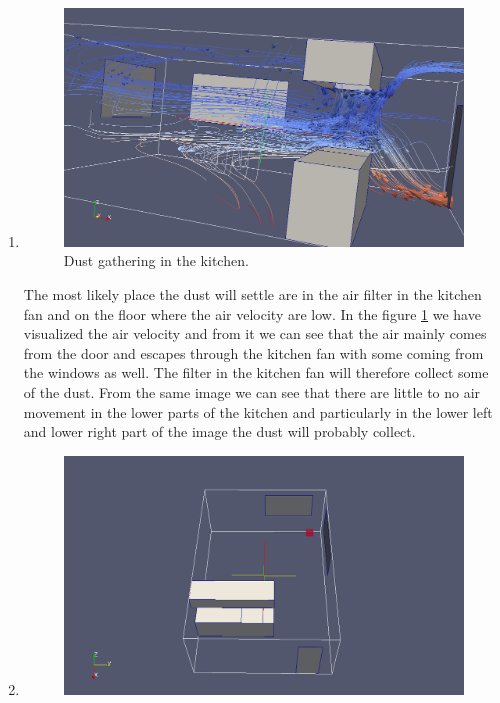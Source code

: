 \documentclass[a4paper]{article}
\begin{document}
\begin{enumerate}
    \item
        \begin{figure}
            \label{fig:dust}
            \includegraphics[width=1\linewidth]{lab5/kitchen-dust-screenshot.png}
            \caption{Dust gathering in the kitchen.}
        \end{figure}
        The most likely place the dust will settle are in the air filter in the
        kitchen fan and on the floor where the air velocity are low. In the
        figure \ref{fig:dust} we have visualized the air velocity and from it we can see
        that the air mainly comes from the door and escapes through the kitchen
        fan with some coming from the windows as well. The filter in the kitchen
        fan will therefore collect some of the dust. From the same image we can
        see that there are little to no air movement in the lower parts of the
        kitchen and particularly in the lower left and lower right part of the
        image the dust will probably collect.
    \item
        \begin{figure}
            \label{fig:pressure}
            \includegraphics[width=1\linewidth]{lab5/kitchen-highest-pressure-screenshot.png}

\end{figure}
\end{enumerate}
\end{document}

